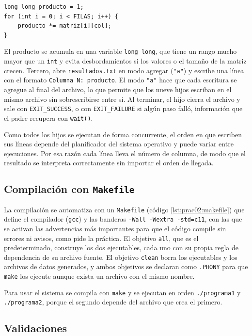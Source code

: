 \begin{lstlisting}[style=C]
long long producto = 1;
for (int i = 0; i < FILAS; i++) {
    producto *= matriz[i][col];
}
\end{lstlisting}

El producto se acumula en una variable \texttt{long long}, que tiene un rango mucho mayor que un \texttt{int} y evita desbordamientos si los valores o el tamaño de la matriz crecen. Tercero, abre \texttt{resultados.txt} en modo agregar (\texttt{"a"}) y escribe una línea con el formato \texttt{Columna N: producto}. El modo \texttt{"a"} hace que cada escritura se agregue al final del archivo, lo que permite que los nueve hijos escriban en el mismo archivo sin sobrescribirse entre sí. Al terminar, el hijo cierra el archivo y sale con \texttt{EXIT\_SUCCESS}, o con \texttt{EXIT\_FAILURE} si algún paso falló, información que el padre recupera con \texttt{wait()}.

Como todos los hijos se ejecutan de forma concurrente, el orden en que escriben sus líneas depende del planificador del sistema operativo y puede variar entre ejecuciones. Por esa razón cada línea lleva el número de columna, de modo que el resultado se interpreta correctamente sin importar el orden de llegada.

\subsection{Compilación con \texttt{Makefile}}
\label{sec:prac02:makefile}

La compilación se automatiza con un \texttt{Makefile} (código \ref{lst:prac02:makefile}) que define el compilador (\texttt{gcc}) y las banderas \texttt{-Wall -Wextra -std=c11}, con las que se activan las advertencias más importantes para que el código compile sin errores ni avisos, como pide la práctica. El objetivo \texttt{all}, que es el predeterminado, construye los dos ejecutables, cada uno con su propia regla de dependencia de su archivo fuente. El objetivo \texttt{clean} borra los ejecutables y los archivos de datos generados, y ambos objetivos se declaran como \texttt{.PHONY} para que \texttt{make} los ejecute aunque exista un archivo con el mismo nombre.

Para usar el sistema se compila con \texttt{make} y se ejecutan en orden \texttt{./programa1} y \texttt{./programa2}, porque el segundo depende del archivo que crea el primero.

\subsection{Validaciones}
\label{sec:prac02:validaciones}

